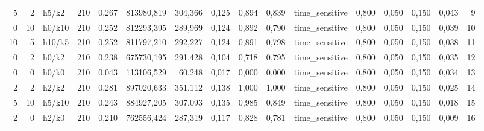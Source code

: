\begin{longtable}{rrlrrrrrrrlrrrrr}
5 & 2 & h5/k2 & 210 & 0,267 & 813980,819 & 304,366 & 0,125 & 0,894 & 0,839 & time\_sensitive & 0,800 & 0,050 & 0,150 & 0,043 & 9 \\
0 & 10 & h0/k10 & 210 & 0,252 & 812293,395 & 289,969 & 0,124 & 0,892 & 0,790 & time\_sensitive & 0,800 & 0,050 & 0,150 & 0,039 & 10 \\
10 & 5 & h10/k5 & 210 & 0,252 & 811797,210 & 292,227 & 0,124 & 0,891 & 0,798 & time\_sensitive & 0,800 & 0,050 & 0,150 & 0,038 & 11 \\
0 & 2 & h0/k2 & 210 & 0,238 & 675730,195 & 291,428 & 0,104 & 0,718 & 0,795 & time\_sensitive & 0,800 & 0,050 & 0,150 & 0,035 & 12 \\
0 & 0 & h0/k0 & 210 & 0,043 & 113106,529 & 60,248 & 0,017 & 0,000 & 0,000 & time\_sensitive & 0,800 & 0,050 & 0,150 & 0,034 & 13 \\
2 & 2 & h2/k2 & 210 & 0,281 & 897020,633 & 351,112 & 0,138 & 1,000 & 1,000 & time\_sensitive & 0,800 & 0,050 & 0,150 & 0,025 & 14 \\
5 & 10 & h5/k10 & 210 & 0,243 & 884927,205 & 307,093 & 0,135 & 0,985 & 0,849 & time\_sensitive & 0,800 & 0,050 & 0,150 & 0,018 & 15 \\
2 & 0 & h2/k0 & 210 & 0,210 & 762556,424 & 287,319 & 0,117 & 0,828 & 0,781 & time\_sensitive & 0,800 & 0,050 & 0,150 & 0,009 & 16 \\
\end{longtable}
